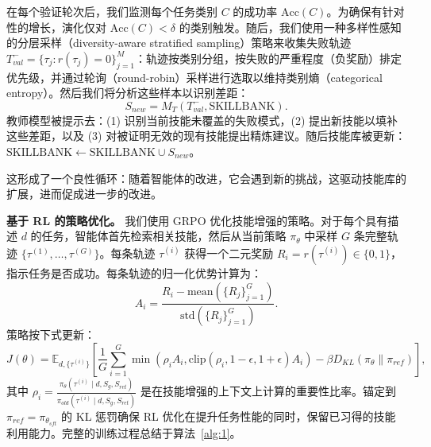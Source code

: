\documentclass[11pt,UTF8,fontset=fandol]{ctexart}
\begin{document}
在每个验证轮次后，我们监测每个任务类别 $C$ 的成功率 $\text{Acc}(C)$。为确保有针对性的增长，演化仅对 $\text{Acc}(C) < \delta$ 的类别触发。随后，我们使用一种多样性感知的分层采样（diversity-aware stratified sampling）策略来收集失败轨迹 $T_{val}^- = \{\tau_j : r(\tau_j) = 0\}_{j=1}^M$：轨迹按类别分组，按失败的严重程度（负奖励）排定优先级，并通过轮询（round-robin）采样进行选取以维持类别熵（categorical entropy）。然后我们将分析这些样本以识别差距：
\begin{equation}
S_{new} = M_T(T_{val}^-, \text{SKILLBANK}).
\end{equation}
教师模型被提示去：(1) 识别当前技能未覆盖的失败模式，(2) 提出新技能以填补这些差距，以及 (3) 对被证明无效的现有技能提出精炼建议。随后技能库被更新：$\text{SKILLBANK} \leftarrow \text{SKILLBANK} \cup S_{new}$。

这形成了一个良性循环：随着智能体的改进，它会遇到新的挑战，这驱动技能库的扩展，进而促成进一步的改进。

\textbf{基于 RL 的策略优化。} 我们使用 GRPO 优化技能增强的策略。对于每个具有描述 $d$ 的任务，智能体首先检索相关技能，然后从当前策略 $\pi_\theta$ 中采样 $G$ 条完整轨迹 $\{\tau^{(1)}, \ldots, \tau^{(G)}\}$。每条轨迹 $\tau^{(i)}$ 获得一个二元奖励 $R_i = r(\tau^{(i)}) \in \{0, 1\}$，指示任务是否成功。每条轨迹的归一化优势计算为：
\begin{equation}
A_i = \frac{R_i - \text{mean}(\{R_j\}_{j=1}^G)}{\text{std}(\{R_j\}_{j=1}^G)}.
\end{equation}
策略按下式更新：
\begin{equation}
J(\theta) = \mathbb{E}_{d, \{\tau^{(i)}\}} \left[ \frac{1}{G} \sum_{i=1}^G \min\left( \rho_i A_i, \text{clip}(\rho_i, 1-\epsilon, 1+\epsilon) A_i \right) - \beta D_{KL}(\pi_\theta \| \pi_{ref}) \right],
\end{equation}
其中 $\rho_i = \frac{\pi_\theta(\tau^{(i)} \mid d, S_g, S_{ret})}{\pi_{old}(\tau^{(i)} \mid d, S_g, S_{ret})}$ 是在技能增强的上下文上计算的重要性比率。锚定到 $\pi_{ref} = \pi_{\theta_{sft}}$ 的 KL 惩罚确保 RL 优化在提升任务性能的同时，保留已习得的技能利用能力。完整的训练过程总结于算法~\ref{alg:1}。
\end{document}
